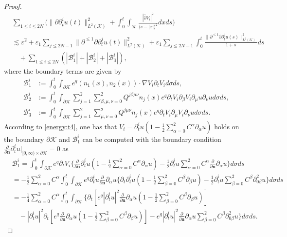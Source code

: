 \documentclass[11pt,twoside]{article}
\def\cB{\mathcal B}
\def\cK{\mathcal K}
\def\ds{\displaystyle}
\def\p{\partial}
\def\ve{\varepsilon}
\def\ls{\lesssim}
\def\bn{\mathbf{n}}
\newcommand{\w}[1]{\langle {#1} \rangle}
\theoremstyle{plain}
\theoremstyle{definition}
\numberwithin{equation}{section}
\begin{document}
\begin{proof}
\begin{equation}\label{energy:t11}
\begin{split}
&\sum_{1\le i\le2N}\Big(\|\p\p_t^iu(t)\|^2_{L^2(\cK)}+\int_0^t\int_{\cK}\frac{|\bar\p V_i|^2}{\w{s-|x|}^2}dxds\Big)\\
&\ls\ve^2+\ve_1\sum_{j\le2N-1}\|\p^{\le1}\p\p_t^ju(t)\|^2_{L^2(\cK)}
+\ve_1\sum_{j\le2N-1}\int_0^t\frac{\|\p^{\le1}\p\p_t^ju(s)\|^2_{L^2(\cK)}}{1+s}ds\\
&\quad+\sum_{1\le i\le2N}(|\cB_1^i|+|\cB_2^i|+|\cB_3^i|),
\end{split}
\end{equation}
where the boundary terms are given by
\begin{equation}\label{energy:t12}
\begin{split}
\cB_1^i&:=\int_0^t\int_{\p\cK}e^q(n_1(x),n_2(x))\cdot\nabla V_i\p_tV_id\sigma ds,\\
\cB_2^i&:=\int_0^t\int_{\p\cK}\sum_{j=1}^2\sum_{\beta,\mu,\nu=0}^2
Q^{j\beta\mu\nu}n_j(x)e^q\p_tV_i\p_{\beta}V_i\p_{\mu}u\p_{\nu}ud\sigma ds,\\
\cB_3^i&:=\int_0^t\int_{\p\cK}\sum_{j=1}^2\sum_{\mu,\nu=0}^2
Q^{j\mu\nu}n_j(x)e^q\p_tV_i\p_{\mu}V_i\p_{\nu}ud\sigma ds.
\end{split}
\end{equation}
According to \eqref{energy:t4}, one has that  $\ds V_i=\p_t^iu(1-\frac12\sum_{\alpha=0}^2C^{\alpha}\p_{\alpha}u)$
holds on the boundary $\p\cK$ and $\cB_1^i$ can be computed with the boundary condition $\frac{\p}{\p\bn}\p_t^{\ell}u|_{[0,\infty)\times\p\cK}=0$
as
\begin{equation}\label{energy:t13}
\begin{split}
&\cB_1^i=\int_0^t\int_{\p\cK}e^q\p_tV_i\Big\{\frac{\p}{\p\bn}\p_t^iu(1-\frac12\sum_{\alpha=0}^2C^{\alpha}\p_{\alpha}u)
-\frac12\p_t^iu\sum_{\alpha=0}^2C^{\alpha}\frac{\p}{\p\bn}\p_{\alpha}u\Big\}d\sigma ds\\
&=-\frac12\sum_{\alpha=0}^2C^{\alpha}\int_0^t\int_{\p\cK}e^q\p_t^iu\frac{\p}{\p\bn}\p_{\alpha}u
\Big\{\p_t\p_t^iu(1-\frac12\sum_{\beta=0}^2C^{\beta}\p_{\beta}u)-\frac12\p_t^iu\sum_{\beta=0}^2C^{\beta}\p^2_{0\beta}u\Big\}d\sigma ds\\
&=-\frac14\sum_{\alpha=0}^2C^{\alpha}\int_0^t\int_{\p\cK}\Big\{\p_t[e^q|\p_t^iu|^2\frac{\p}{\p\bn}\p_{\alpha}u(1-\frac12\sum_{\beta=0}^2C^{\beta}\p_{\beta}u)]\\
&\quad-|\p_t^iu|^2\p_t[e^q\frac{\p}{\p\bn}\p_{\alpha}u(1-\frac12\sum_{\beta=0}^2C^{\beta}\p_{\beta}u)]
-e^q|\p_t^iu|^2\frac{\p}{\p\bn}\p_{\alpha}u\sum_{\beta=0}^2C^{\beta}\p^2_{0\beta}u\Big\}d\sigma ds.

\end{split}
\end{equation}
\end{proof}
\end{document}
